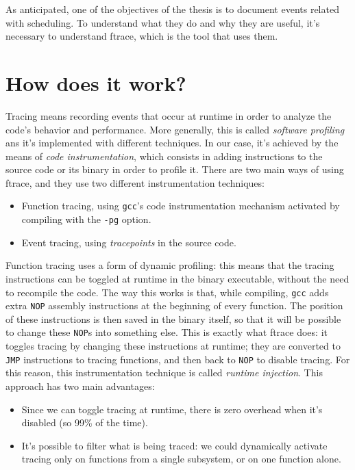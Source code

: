 \documentclass[10pt]{book}
\begin{document}
As anticipated, one of the objectives of the thesis is to document events related with scheduling. To understand what they do and why they are useful, it's necessary to understand ftrace, which is the tool that uses them.
\section{How does it work?}
\label{sec:how_does_it_work}

Tracing means recording events that occur at runtime in order to analyze the code's behavior and performance. More generally, this is called \textit{software profiling} ans it's implemented with different techniques. In our case, it's achieved by the means of \textit{code instrumentation}, which consists in adding instructions to the source code or its binary in order to profile it. There are two main ways of using ftrace, and they use two different instrumentation techniques:
\begin{itemize}
    \item Function tracing, using \verb|gcc|'s code instrumentation mechanism activated by compiling with the \verb|-pg| option.
    \item Event tracing, using \textit{tracepoints} in the source code.
\end{itemize}
Function tracing uses a form of dynamic profiling: this means that the tracing instructions can be toggled at runtime in the binary executable, without the need to recompile the code. The way this works is that, while compiling, \verb|gcc| adds extra \verb|NOP| assembly instructions at the beginning of every function. The position of these instructions is then saved in the binary itself, so that it will be possible to change these \verb|NOP|s into something else. This is exactly what ftrace does: it toggles tracing by changing these instructions at runtime; they are converted to \verb|JMP| instructions to tracing functions, and then back to \verb|NOP| to disable tracing. For this reason, this instrumentation technique is called \textit{runtime injection}. This approach has two main advantages: 
\begin{itemize}
    \item Since we can toggle tracing at runtime, there is zero overhead when it's disabled (so 99\% of the time).
    \item It's possible to filter what is being traced: we could dynamically activate tracing only on functions from a single subsystem, or on one function alone.
\end{itemize}
\end{document}
